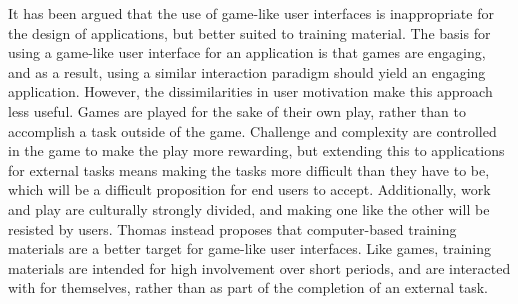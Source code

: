 It has been argued that the use of game-like user interfaces is inappropriate for the design of applications, but better suited to training material\citep{thomas1994games}. The basis for using a game-like user interface for an application is that games are engaging, and as a result, using a similar interaction paradigm should yield an engaging application. 
However, the dissimilarities in user motivation make this approach less useful. 
Games are played for the sake of their own play, rather than to accomplish a task outside of the game. 
Challenge and complexity are controlled in the game to make the play more rewarding, but extending this to applications for external tasks means making the tasks more difficult than they have to be, which will be a difficult proposition for end users to accept. 
Additionally, work and play are culturally strongly divided, and making one like the other will be resisted by users. 
Thomas instead proposes that computer-based training materials are a better target for game-like user interfaces. 
Like games, training materials are intended for high involvement over short periods, and are interacted with for themselves, rather than as part of the completion of an external task. 
